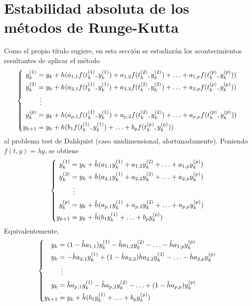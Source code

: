 \documentclass[11pt]{report}
\theoremstyle{mytheorem}
\theoremstyle{mydefinition}
\theoremstyle{myexample}
\begin{document}
\section{Estabilidad absoluta de los métodos de Runge-Kutta}

Como el propio título sugiere, en esta sección se estudiarán los acontecimientos resultantes de aplicar el método
\[\left\{\begin{alignedat}{1}
    y_k^{(1)} &= y_k+h(a_{1,1}f(t_k^{(1)},y_k^{(1)})+a_{1,2}f(t_k^{(2)},y_k^{(2)})+\mathellipsis+a_{1,p}f(t_k^{(p)},y_k^{(p)})) \\
    y_k^{(2)} &= y_k+h(a_{2,1}f(t_k^{(1)},y_k^{(1)})+a_{2,2}f(t_k^{(2)},y_k^{(2)})+\mathellipsis+a_{2,p}f(t_k^{(p)},y_k^{(p)})) \\
    &\phantom{\vdots} \vdots \\
    y_k^{(p)} &= y_k+h(a_{p,1}f(t_k^{(1)},y_k^{(1)})+a_{p,2}f(t_k^{(2)},y_k^{(2)})+\mathellipsis+a_{p,p}f(t_k^{(p)},y_k^{(p)})) \\
    y_{k+1} &= y_k+h(b_1f(t_k^{(1)},y_k^{(1)})+\mathellipsis+b_pf(t_k^{(p)},y_k^{(p)}))
\end{alignedat}\right.\]
al problema test de Dahlquist (caso unidimensional, afortunadamente). Poniendo $f(t,y) = \lambda y$, se obtiene
\[\left\{\begin{alignedat}{1}
    y_k^{(1)} &= y_k+\hat{h}(a_{1,1}y_k^{(1)}+a_{1,2}y_k^{(2)}+\mathellipsis+a_{1,p}y_k^{(p)}) \\
    y_k^{(2)} &= y_k+\hat{h}(a_{2,1}y_k^{(1)}+a_{2,2}y_k^{(2)}+\mathellipsis+a_{2,p}y_k^{(p)}) \\
    &\phantom{\vdots} \vdots \\
    y_k^{(p)} &= y_k+\hat{h}(a_{p,1}y_k^{(1)}+a_{p,2}y_k^{(2)}+\mathellipsis+a_{p,p}y_k^{(p)}) \\
    y_{k+1} &= y_k+\hat{h}(b_1y_k^{(1)}+\mathellipsis+b_py_k^{(p)})
\end{alignedat}\right.\]
Equivalentemente,
\[\left\{\begin{alignedat}{1}
    y_k &= (1-\hat{h}a_{1,1})y_k^{(1)} -\hat{h}a_{1,2}y_k^{(2)}-\mathellipsis-\hat{h}a_{1,p}y_k^{(p)}  \\
    y_k &= -\hat{h}a_{2,1}y_k^{(1)} +(1-\hat{h}a_{2,2})\hat{h}a_{2,2}y_k^{(2)}-\mathellipsis-\hat{h}a_{2,p}y_k^{(p)}   \\
    &\phantom{\vdots} \vdots \\
    y_k &= \hat{h}a_{p,1}y_k^{(1)} -\hat{h}a_{p,2}y_k^{(2)}-\mathellipsis+(1-\hat{h}a_{p,p})y_k^{(p)}  \\
    y_{k+1} &= y_k+\hat{h}(b_1y_k^{(1)}+\mathellipsis+b_py_k^{(p)})
\end{alignedat}\right.\]
\end{document}

